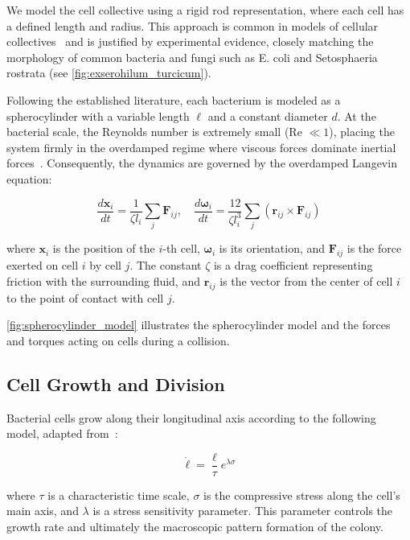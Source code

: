 \documentclass[conference]{IEEEtran}
\begin{document}
We model the cell collective using a rigid rod representation, where each cell has a defined length and radius. This approach is common in models of cellular collectives~\cite{You2018, Weady2024, Blanchard2015, Warren2019, Ghosh2015} and is justified by experimental evidence, closely matching the morphology of common bacteria and fungi such as E. coli and Setosphaeria rostrata (see \autoref{fig:exserohilum_turcicum}).

Following the established literature, each bacterium is modeled as a spherocylinder with a variable length $\ell$ and a constant diameter $d$. At the bacterial scale, the Reynolds number is extremely small (Re $\ll 1$), placing the system firmly in the overdamped regime where viscous forces dominate inertial forces~\cite{datta2024lifelowreynoldsnumber,Rudge2012 }. Consequently, the dynamics are governed by the overdamped Langevin equation:

\begin{equation} \label{eq:overdamped_langevin}
    \frac{d \mathbf{x}_i}{dt} = \frac{1}{\zeta l_i} \sum_j \mathbf{F}_{ij}, \quad \frac{d \boldsymbol{\omega}_i}{dt} = \frac{12}{\zeta l_i^3} \sum_j (\mathbf{r}_{ij} \times \mathbf{F}_{ij})
\end{equation}

where $\mathbf{x}_i$ is the position of the $i$-th cell, $\boldsymbol{\omega}_i$ is its orientation, and $\mathbf{F}_{ij}$ is the force exerted on cell $i$ by cell $j$. The constant $\zeta$ is a drag coefficient representing friction with the surrounding fluid, and $\mathbf{r}_{ij}$ is the vector from the center of cell $i$ to the point of contact with cell $j$.

\autoref{fig:spherocylinder_model} illustrates the spherocylinder model and the forces and torques acting on cells during a collision.


\subsection{Cell Growth and Division}

Bacterial cells grow along their longitudinal axis according to the following model, adapted from~\cite{Weady2024}:

\begin{equation} \label{eq:growth}
    \dot{{\ell}} = \frac{{\ell}}{\tau} e^{\lambda \sigma}
\end{equation}

where $\tau$ is a characteristic time scale, $\sigma$ is the compressive stress along the cell's main axis, and $\lambda$ is a stress sensitivity parameter. This parameter controls the growth rate and ultimately the macroscopic pattern formation of the colony.
\end{document}
